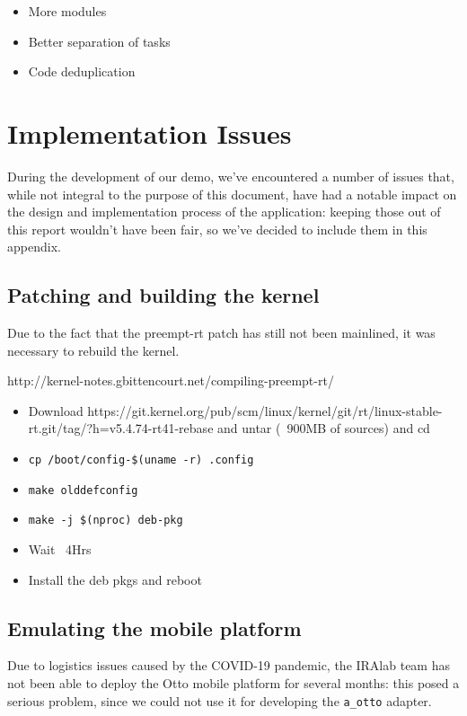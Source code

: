 \documentclass[a4paper,12pt]{report}
\begin{document}
\begin{itemize}
    \item More modules
    \item Better separation of tasks
    \item Code deduplication
\end{itemize}

\newpage
\chapter{Implementation Issues}

During the development of our demo, we've encountered a number of issues that, while not integral to the purpose of this document, have had a notable impact on the design and implementation process of the application: keeping those out of this report wouldn't have been fair, so we've decided to include them in this appendix. 

\section{Patching and building the kernel}

Due to the fact that the preempt-rt patch has still not been mainlined, it was necessary to rebuild the kernel. 

http://kernel-notes.gbittencourt.net/compiling-preempt-rt/

\begin{itemize}
    \item Download https://git.kernel.org/pub/scm/linux/kernel/git/rt/linux-stable-rt.git/tag/?h=v5.4.74-rt41-rebase and untar (~900MB of sources) and cd
    \item \texttt{cp /boot/config-\$(uname -r) .config}
    \item \texttt{make olddefconfig}
    \item \texttt{make -j \$(nproc) deb-pkg}
    \item Wait ~4Hrs
    \item Install the deb pkgs and reboot
\end{itemize}

\section{Emulating the mobile platform}

Due to logistics issues caused by the COVID-19 pandemic, the IRAlab team has not been able to deploy the Otto mobile platform for several months: this posed a serious problem, since we could not use it for developing the \texttt{a\_otto} adapter.
\end{document}
